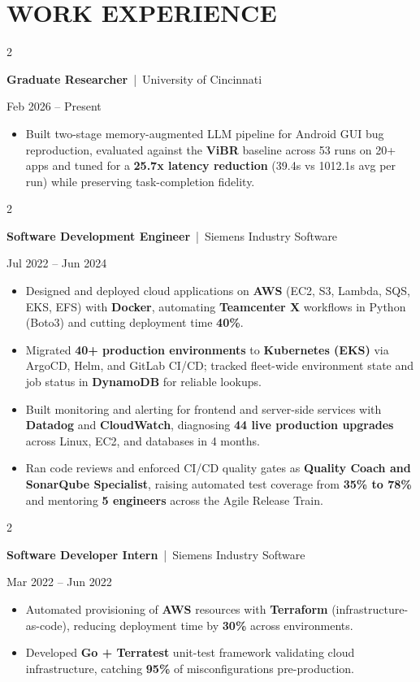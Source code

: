 \documentclass[10pt, letterpaper]{article}
\newenvironment{highlights}{
    \begin{itemize}[
        topsep=0.10 cm,
        parsep=0.06 cm,
        partopsep=0pt,
        itemsep=0.06 cm,
        leftmargin=12pt
    ]
}{
    \end{itemize}
}
\newenvironment{twocolentry}[2][]{
    \onecolentry
    \def\secondColumn{#2}
    \setcolumnwidth{\fill, 4.5 cm}
    \begin{paracol}{2}
}{
    \switchcolumn \raggedleft \secondColumn
    \end{paracol}
    \endonecolentry
}
\begin{document}
\section{WORK EXPERIENCE}
\begin{twocolentry}{Feb 2026 -- Present}
\textbf{Graduate Researcher} \,|\, University of Cincinnati
\end{twocolentry}
\begin{highlights}
  \item Built two-stage memory-augmented LLM pipeline for Android GUI bug reproduction, evaluated against the \textbf{ViBR} baseline across 53 runs on 20+ apps and tuned for a \textbf{25.7x latency reduction} (39.4s vs 1012.1s avg per run) while preserving task-completion fidelity.
\end{highlights}

\vspace{0.15 cm}

\begin{twocolentry}{Jul 2022 -- Jun 2024}
\textbf{Software Development Engineer} \,|\, Siemens Industry Software
\end{twocolentry}
\begin{highlights}
  \item Designed and deployed cloud applications on \textbf{AWS} (EC2, S3, Lambda, SQS, EKS, EFS) with \textbf{Docker}, automating \textbf{Teamcenter X} workflows in Python (Boto3) and cutting deployment time \textbf{40\%}.
  \item Migrated \textbf{40+ production environments} to \textbf{Kubernetes (EKS)} via ArgoCD, Helm, and GitLab CI/CD; tracked fleet-wide environment state and job status in \textbf{DynamoDB} for reliable lookups.
  \item Built monitoring and alerting for frontend and server-side services with \textbf{Datadog} and \textbf{CloudWatch}, diagnosing \textbf{44 live production upgrades} across Linux, EC2, and databases in 4 months.
  \item Ran code reviews and enforced CI/CD quality gates as \textbf{Quality Coach and SonarQube Specialist}, raising automated test coverage from \textbf{35\% to 78\%} and mentoring \textbf{5 engineers} across the Agile Release Train.
\end{highlights}

\vspace{0.15 cm}

\begin{twocolentry}{Mar 2022 -- Jun 2022}
\textbf{Software Developer Intern} \,|\, Siemens Industry Software
\end{twocolentry}
\begin{highlights}
  \item Automated provisioning of \textbf{AWS} resources with \textbf{Terraform} (infrastructure-as-code), reducing deployment time by \textbf{30\%} across environments.
  \item Developed \textbf{Go + Terratest} unit-test framework validating cloud infrastructure, catching \textbf{95\%} of misconfigurations pre-production.
\end{highlights}
\end{document}
